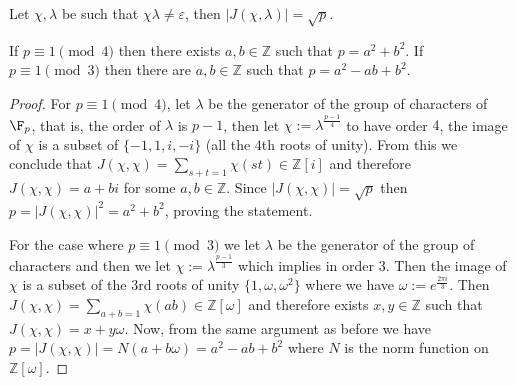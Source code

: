 \begin{proposition}
   Let \(\chi,\lambda\) be such that  \(\chi\lambda \neq  \varepsilon\), then
   \(|J(\chi,\lambda)| = \sqrt{p}\).
\end{proposition}

\begin{proposition}
   If \(p \equiv 1 \pmod{4}\) then there exists \(a, b \in \mathbb{Z}\) such
   that \(p = a^2 + b^2\). If  \(p \equiv 1 \pmod{3}\) then there are  \(a, b
   \in \mathbb{Z}\) such that \(p = a^2 - ab + b^2\).
\end{proposition}

\begin{proof}
   For \(p \equiv 1 \pmod{4}\), let \(\lambda \) be the generator of the group
   of characters of \(\F_p\), that is, the order of \(\lambda\) is \(p-1\), then
   let \(\chi := \lambda^{\frac{p-1}{4}}\) to have order \(4\), the image of
   \(\chi\) is a subset of \(\{-1, 1, i, -i\}\) (all the \(4\)th roots of
   unity). From this we conclude that \(J(\chi, \chi) = \sum_{s + t=1} \chi(st)
   \in \mathbb{Z}[i]\) and therefore \(J(\chi, \chi) = a + bi\) for some  \(a,
   b \in \mathbb{Z}\). Since \(|J(\chi,\chi)| = \sqrt{p}\) then \(p = |J(\chi,
   \chi)|^2 = a^2 + b^2\), proving the statement. 

   For the case where \(p \equiv 1 \pmod{3}\) we let  \(\lambda\) be the
   generator of the group of characters and then we let \(\chi := \lambda^{
   \frac{p-1}{3}}\) which implies in order \(3\). Then the image of  \(\chi \)
   is a subset of the \(3\)rd roots of unity \(\{1, \omega, \omega^2\}\) where
   we have \(\omega:= e^{\frac{2\pi i }{3}}\). Then \(J(\chi, \chi) = \sum_{a+b
   = 1} \chi(ab) \in \mathbb{Z}[\omega]\) and therefore exists \(x, y \in
   \mathbb{Z}\) such that \(J(\chi, \chi) =x + y\omega\). Now, from the same
   argument as before we have  \(p = |J(\chi, \chi)| = N(a + b\omega) = a^2 - ab
   + b^2\) where \(N\) is the norm function on \(\mathbb{Z}[\omega]\).
\end{proof}
